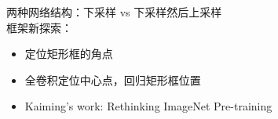 \documentclass[UTF8, a4paper]{ctexart}
\begin{document}
两种网络结构：下采样 vs 下采样然后上采样\cite{FishNet_sun_2018_neurips}\\

框架新探索：
\begin{itemize}
    \item 定位矩形框的角点\cite{corner_local_text_Lyu_2018_CVPR,CornerNet_Law_2018_ECCV}
    \item 全卷积定位中心点，回归矩形框位置\cite{FCOS_tian2019}
    \item Kaiming's work: Rethinking ImageNet Pre-training
\end{itemize}


\ifx\allfiles\undefined
\end{document}
